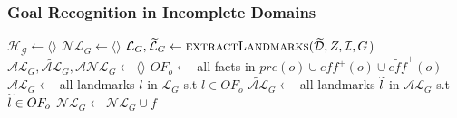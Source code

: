 \documentclass{beamer}
\newcommand{\todo}[1]{ {\color{red} #1} }
\begin{document}
\begin{frame}[c]\frametitle{Goal Recognition in Incomplete Domains}
	    \label{alg:RecognizeIncompleteDomains}
	    \begin{algorithmic}[1]
			{\footnotesize
			\State $\mathcal{H}_{\mathcal{G}} \gets \langle \rangle$ 
				\State $\mathcal{NL}_{G} \gets \langle \rangle$ 
				\State $\mathcal{L}_{G}, \mathcal{\widetilde{L}}_{G} \gets \textsc{extractLandmarks}(\widetilde{\mathcal{D}}, Z, \mathcal{I}, G$) %
				\State $\mathcal{AL}_{G}, \mathcal{\widetilde{AL}}_{G}, \mathcal{ANL}_{G} \gets \langle \rangle$ 
					\State $OF_{o} \gets$ all facts in $\mathit{pre}(o) \cup \mathit{eff}^{+}(o) \cup \widetilde{\mathit{eff}}^{+}(o)$ \label{alg:RecognizeIncompleteDomains:UpdateState}
					\State $\mathcal{AL}_{G} \gets $ all landmarks $l$ in $\mathcal{L}_{G}$ s.t $l \in OF_{o}$ \label{alg:RecognizeIncompleteDomains:AchievedDefiniteLandmarks}
					\State $\mathcal{\widetilde{AL}}_{G} \gets $ all landmarks $\widetilde{l}$ in $\mathcal{AL}_{G}$ s.t $\widetilde{l} \in OF_{o}$ \label{alg:RecognizeIncompleteDomains:AchievedPossibleLandmarks}
						 \label{alg:RecognizeIncompleteDomains:OverlookedLandmarks}
							\State $\mathcal{NL}_{G} \gets \mathcal{NL}_{G} \cup f$ \label{alg:RecognizeIncompleteDomains:OverlookedLandmarksStore}
}
\end{algorithmic}
\end{frame}
\end{document}
